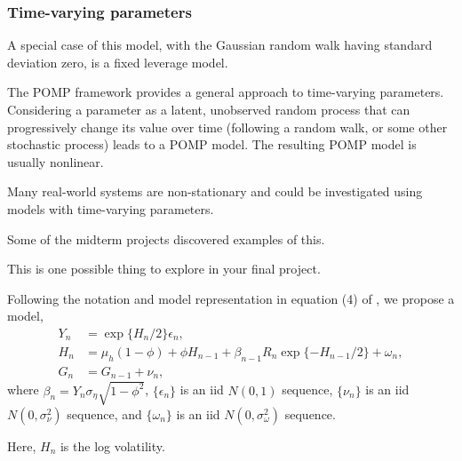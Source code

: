 \documentclass{beamer}\usepackage[]{graphicx}\usepackage[]{color}
\begin{document}
\begin{frame}[fragile]


\frametitle{Time-varying parameters}

\bi

\item A special case of this model, with the Gaussian random walk having standard deviation zero, is a fixed leverage model.

\item The POMP framework provides a general approach to time-varying parameters. Considering a parameter as a latent, unobserved random process that can progressively change its value over time (following a random walk, or some other stochastic process) leads to a POMP model. The resulting POMP model is usually nonlinear.

\item Many real-world systems are non-stationary and could be investigated using models with time-varying parameters. 

\item Some of the midterm projects discovered examples of this.

\item This is one possible thing to explore in your final project.

\ei

\end{frame}

\begin{frame}[fragile]

\bi

\item Following the notation and model representation in equation (4) of \citet{breto14}, we propose a model,
\begin{align} 
Y_n &= \exp\{H_n/2\} \epsilon_n, \\
H_n &= \mu_h(1-\phi) + \phi H_{n-1} +
\beta_{n-1}R_n\exp\{-H_{n-1}/2\} + \omega_n,\\
G_n &= G_{n-1}+\nu_n,
\end{align}
where $\beta_n=Y_n\sigma_\eta\sqrt{1-\phi^2}$, $\{\epsilon_n\}$ is an iid $N(0,1)$ sequence, $\{\nu_n\}$ is an iid $N(0,\sigma_{\nu}^2)$ sequence, and $\{\omega_n\}$ is an iid $N(0,\sigma_\omega^2)$ sequence.

\item Here, $H_n$ is the log volatility.

\ei

\end{frame}
\end{document}

